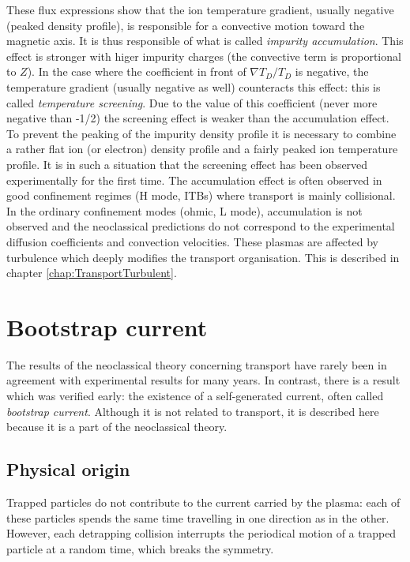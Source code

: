 These flux expressions show that the ion temperature gradient, usually negative (peaked density profile), is responsible for a convective motion toward the magnetic axis. It is thus responsible of what is called \textit{impurity accumulation}. This effect is stronger with higer impurity charges (the convective term is proportional to $Z$). In the case where the coefficient in front of $\nabla T_D/T_D$ is negative, the temperature gradient (usually negative as well) counteracts this effect: this is called \textit{temperature screening}. Due to the value of this coefficient (never more negative than -1/2) the screening effect is weaker than the accumulation effect. To prevent the peaking of the impurity density profile it is necessary to combine a rather flat ion (or electron) density profile and a fairly peaked ion temperature profile. It is in such a situation that the screening effect has been observed experimentally for the first time. The accumulation effect is often observed in good confinement regimes (H mode, ITBs) where transport is mainly collisional. In the ordinary confinement modes (ohmic, L mode), accumulation is not observed and the neoclassical predictions do not correspond to the experimental diffusion coefficients and convection velocities. These plasmas are affected by turbulence which deeply modifies the transport organisation. This is described in chapter \ref{chap:TransportTurbulent}.


		\section{Bootstrap current}
		\label{sub:CourantAutoGenere}


The results of the neoclassical theory concerning transport have rarely been in agreement with experimental results for many years.	In contrast, there is a result which was verified early: the existence of a self-generated current, often called \textit{bootstrap current}. Although it is not related to transport, it is described here because it is a part of the neoclassical theory.

		\subsection{Physical origin}
		\label{sub:OriginePhysiqueBootstrap}


Trapped particles do not contribute to the current carried by the plasma: each of these particles spends the same time travelling in one direction as in the other. However, each detrapping collision interrupts the periodical motion of a trapped particle at a random time, which breaks the symmetry.		

